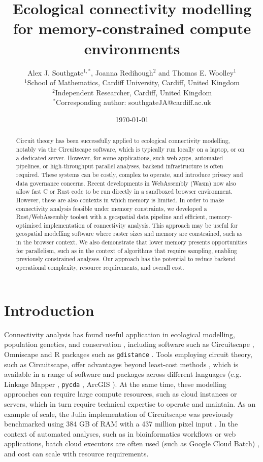 \documentclass[11pt, a4paper]{article}
\title{Ecological connectivity modelling for memory-constrained compute environments}
\author{
  Alex J. Southgate$^{1,*}$, Joanna Redihough$^{2}$ and Thomas E. Woolley$^{1}$\\[1em]
  \small $^{1}$School of Mathematics, Cardiff University, Cardiff, United Kingdom \\
  \small $^{2}$Independent Researcher, Cardiff, United Kingdom \\[1em]
  \small $^{*}$Corresponding author: southgateJA@cardiff.ac.uk
}
\date{\today}
\newcommand{\Cpp}{C\nolinebreak[4]\hspace{-.05em}\raisebox{.4ex}{\relsize{-3}{\textbf{++}}}}
\begin{document}
\maketitle

\begin{abstract}
Circuit theory has been successfully applied to ecological connectivity modelling, 
notably via the Circuitscape \cite{mcrae2007circuit} software, 
which is typically run locally on a laptop, or on a dedicated server. 
However, for some applications, such web apps, automated pipelines,
or high-throughput parallel analyses,
 backend infrastructure is often required.
These systems can be costly, complex to operate, and introduce privacy and data governance concerns.
Recent developments in WebAssembly (Wasm) now also allow fast \Cpp{} or 
Rust code to be run directly in a sandboxed browser environment. 
However, these are also contexts in which memory is limited.
In order to make connectivity analysis feasible under memory constraints,
we developed a Rust/WebAssembly toolset with a geospatial data pipeline and efficient,
memory-optimised implementation of connectivity analysis. 
This approach may be useful for geospatial modelling software where raster sizes and 
memory are constrained, such as in the browser context. 
We also demonstrate that lower memory presents opportunities for parallelism,
such as in the context of algorithms that require sampling, enabling 
previously constrained analyses.
Our approach has the potential to reduce backend operational complexity, resource requirements, 
and overall cost.
\end{abstract}


\section{Introduction}

Connectivity analysis has found useful application in ecological modelling, 
population genetics, and conservation \cite{mcrae2008using, mcrae2006isolation, mcrae2007circuit}, 
including software such as Circuitscape \cite{mcrae2016circuitscape}, Omniscape \cite{landau2021omniscape}
and R packages such as \texttt{gdistance} \cite{van2017r}.
Tools employing circuit theory, such as Circuitscape, offer advantages beyond least-cost methods \cite{mcrae2007circuit},
which is available in a range of software and packages across different languages
(e.g. Linkage Mapper \cite{mcrae2011linkagemapper}, \texttt{pycda} \cite{koehl2024pycda}, ArcGIS \cite{esri2026arcgis}).
At the same time, these modelling approaches can require large compute resources, such as cloud instances or servers,
which in turn require technical expertise to operate and maintain. As an example of scale, 
the Julia implementation of Circuitscape was previously benchmarked 
using 384 GB of RAM with a 437 million pixel input \cite{hall2021circuitscape}.
In the context of automated analyses, such as in bioinformatics workflows or web applications,
batch cloud executors are often used (such as Google Cloud Batch) \cite{seaman2024cloud}, and cost can scale with resource requirements.
\end{document}
